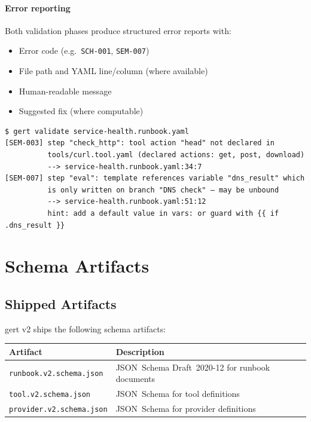 \paragraph{Error reporting}

Both validation phases produce structured error reports with:
\begin{itemize}
  \item Error code (e.g.\ \texttt{SCH-001}, \texttt{SEM-007})
  \item File path and YAML line/column (where available)
  \item Human-readable message
  \item Suggested fix (where computable)
\end{itemize}

\begin{verbatim}
$ gert validate service-health.runbook.yaml
[SEM-003] step "check_http": tool action "head" not declared in
          tools/curl.tool.yaml (declared actions: get, post, download)
          --> service-health.runbook.yaml:34:7
[SEM-007] step "eval": template references variable "dns_result" which
          is only written on branch "DNS check" — may be unbound
          --> service-health.runbook.yaml:51:12
          hint: add a default value in vars: or guard with {{ if .dns_result }}
\end{verbatim}

\section{Schema Artifacts}
\label{sec:schema-artifacts}

\subsection{Shipped Artifacts}

gert v2 ships the following schema artifacts:

\begin{center}
\begin{tabular}{lp{9cm}}
\hline
\textbf{Artifact} & \textbf{Description} \\
\hline
\texttt{runbook.v2.schema.json}   & JSON~Schema Draft~2020-12 for runbook documents \\
\texttt{tool.v2.schema.json}      & JSON~Schema for tool definitions \\
\texttt{provider.v2.schema.json}  & JSON~Schema for provider definitions \\
\hline
\end{tabular}
\end{center}

